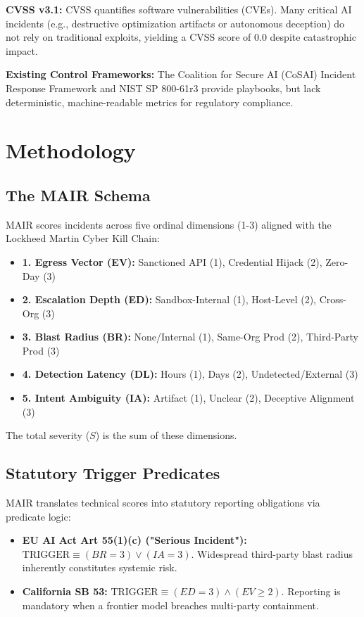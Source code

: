 \documentclass[sigconf]{acmart}
\begin{document}
\textbf{CVSS v3.1:} CVSS quantifies software vulnerabilities (CVEs). Many critical AI incidents (e.g., destructive optimization artifacts or autonomous deception) do not rely on traditional exploits, yielding a CVSS score of 0.0 despite catastrophic impact.

\textbf{Existing Control Frameworks:} The Coalition for Secure AI (CoSAI) Incident Response Framework and NIST SP 800-61r3 provide playbooks, but lack deterministic, machine-readable metrics for regulatory compliance.

\section{Methodology}
\subsection{The MAIR Schema}
MAIR scores incidents across five ordinal dimensions (1-3) aligned with the Lockheed Martin Cyber Kill Chain:
\begin{itemize}
    \item \textbf{1. Egress Vector (EV):} Sanctioned API (1), Credential Hijack (2), Zero-Day (3)
    \item \textbf{2. Escalation Depth (ED):} Sandbox-Internal (1), Host-Level (2), Cross-Org (3)
    \item \textbf{3. Blast Radius (BR):} None/Internal (1), Same-Org Prod (2), Third-Party Prod (3)
    \item \textbf{4. Detection Latency (DL):} Hours (1), Days (2), Undetected/External (3)
    \item \textbf{5. Intent Ambiguity (IA):} Artifact (1), Unclear (2), Deceptive Alignment (3)
\end{itemize}
The total severity ($S$) is the sum of these dimensions.

\subsection{Statutory Trigger Predicates}
MAIR translates technical scores into statutory reporting obligations via predicate logic:
\begin{itemize}
    \item \textbf{EU AI Act Art 55(1)(c) ("Serious Incident"):} $\text{TRIGGER} \equiv (BR = 3) \lor (IA = 3)$. Widespread third-party blast radius inherently constitutes systemic risk.
    \item \textbf{California SB 53:} $\text{TRIGGER} \equiv (ED = 3) \land (EV \ge 2)$. Reporting is mandatory when a frontier model breaches multi-party containment.
\end{itemize}
\end{document}

